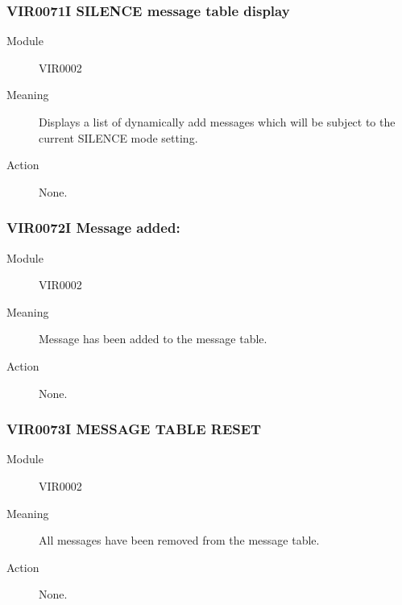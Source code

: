 \documentclass[letterpaper,10pt,english]{sphinxmanual}
\begin{document}
\subsubsection{VIR0071I SILENCE message table display}
\label{\detokenize{messages:vir0071i-silence-message-table-display}}\begin{description}
\item[{Module}] \leavevmode
VIR0002

\item[{Meaning}] \leavevmode
Displays a list of dynamically add messages which will be subject to the current SILENCE mode setting.

\item[{Action}] \leavevmode
None.

\end{description}


\subsubsection{VIR0072I Message added: }
\label{\detokenize{messages:vir0072i-message-added-messageid}}\begin{description}
\item[{Module}] \leavevmode
VIR0002

\item[{Meaning}] \leavevmode
Message  has been added to the message table.

\item[{Action}] \leavevmode
None.

\end{description}


\subsubsection{VIR0073I MESSAGE TABLE RESET}
\label{\detokenize{messages:vir0073i-message-table-reset}}\begin{description}
\item[{Module}] \leavevmode
VIR0002

\item[{Meaning}] \leavevmode
All messages have been removed from the message table.

\item[{Action}] \leavevmode
None.

\end{description}
\end{document}
